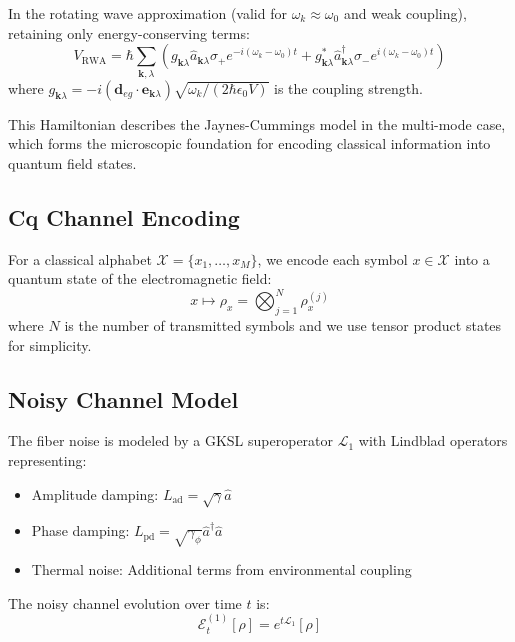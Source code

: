 \documentclass[12pt,a4paper]{article}
\begin{document}
In the rotating wave approximation (valid for $\omega_k \approx \omega_0$ and weak coupling), retaining only energy-conserving terms:
\begin{equation}
V_{\text{RWA}} = \hbar \sum_{\mathbf{k},\lambda} \left(g_{\mathbf{k}\lambda} \hat{a}_{\mathbf{k}\lambda} \sigma_+ e^{-i(\omega_k - \omega_0)t} + g_{\mathbf{k}\lambda}^* \hat{a}_{\mathbf{k}\lambda}^\dagger \sigma_- e^{i(\omega_k - \omega_0)t}\right)
\end{equation}
where $g_{\mathbf{k}\lambda} = -i(\mathbf{d}_{eg} \cdot \mathbf{e}_{\mathbf{k}\lambda}) \sqrt{\omega_k/(2\hbar\epsilon_0 V)}$ is the coupling strength.

This Hamiltonian describes the Jaynes-Cummings model in the multi-mode case, which forms the microscopic foundation for encoding classical information into quantum field states.

\subsection{Cq Channel Encoding}

For a classical alphabet $\mathcal{X} = \{x_1, \ldots, x_M\}$, we encode each symbol $x \in \mathcal{X}$ into a quantum state of the electromagnetic field:
\begin{equation}
x \mapsto \rho_x = \bigotimes_{j=1}^{N} \rho_x^{(j)}
\end{equation}
where $N$ is the number of transmitted symbols and we use tensor product states for simplicity.

\subsection{Noisy Channel Model}

The fiber noise is modeled by a GKSL superoperator $\mathcal{L}_1$ with Lindblad operators representing:
\begin{itemize}
\item Amplitude damping: $L_{\text{ad}} = \sqrt{\gamma} \hat{a}$
\item Phase damping: $L_{\text{pd}} = \sqrt{\gamma_\phi} \hat{a}^\dagger \hat{a}$
\item Thermal noise: Additional terms from environmental coupling
\end{itemize}

The noisy channel evolution over time $t$ is:
\begin{equation}
\mathcal{E}_t^{(1)}[\rho] = e^{t\mathcal{L}_1}[\rho]
\end{equation}
\end{document}
